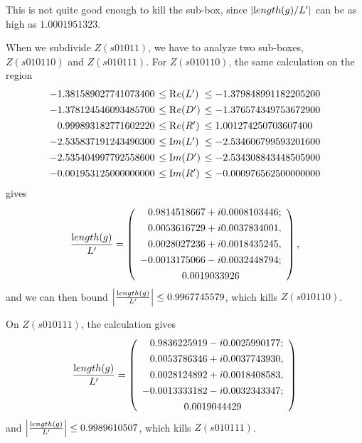 \begin{example}
This is not quite good enough to kill the sub-box, since
$|{\textrm length}(g)/L'|$ can be as high as $1.0001951323$.

When we subdivide $Z(s01011)$, we have to analyze two sub-boxes,
$Z(s010110)$ and $Z(s010111)$.
For $Z(s010110)$, the same calculation on the region
$$\begin{array}{rll}
-1.381589027741073400 &\hskip-6pt \leq {\mathrm Re}(L') &\hskip-6pt\leq -1.379848991182205200\\[4pt]
-1.378124546093485700 &\hskip-6pt\leq {\mathrm Re}(D')
&\hskip-6pt\leq -1.376574349753672900\\[4pt]
0.999893182771602220 &\hskip-6pt\leq {\mathrm Re}(R')&\hskip-6pt \leq 1.001274250703607400\\[4pt]
-2.535837191243490300&\hskip-6pt \leq {\mathrm Im}(L')&\hskip-6pt \leq
-2.534606799593201600\\[4pt]
-2.535404997792558600 &\hskip-6pt\leq {\mathrm Im}(D') &\hskip-6pt\leq -2.534308843448505900\\[4pt]
-0.001953125000000000&\hskip-6pt \leq {\mathrm Im}(R')
&\hskip-6pt\leq -0.000976562500000000
\end{array} 
$$
gives 
$$
{{\textrm length}(g) \over L'} = 
  \left(\begin{array}{c}
 \phantom{-}   0.9814518667 + i 0.0008103446;\\[4pt]
\phantom{-}      0.0053616729 + i 0.0037834001,\\[4pt]
  \phantom{-}    0.0028027236 + i 0.0018435245,\\[4pt]
    -0.0013175066 - i 0.0032448794;\\[4pt]
    0.0019033926
  \end{array}\right),
$$
and we can then bound $\left|{{\textrm length}(g) \over L'}\right| \leq 0.9967745579$,
which kills $Z(s010110)$.  

On $Z(s010111)$, the calculation gives
$$
{{\textrm length}(g) \over L'} =
  \left(\begin{array}{c}
\phantom{-}      0.9836225919 - i 0.0025990177;\\[4pt]
  \phantom{-}    0.0053786346 + i 0.0037743930,\\[4pt]
 \phantom{-}     0.0028124892 + i 0.0018408583,\\[4pt]
    -0.0013333182 - i 0.0032343347;\\[4pt]
    0.0019044429
  \end{array}\right)
$$
and $\left|{{\textrm length}(g) \over L'}\right| \leq 0.9989610507$,
which kills $Z(s010111)$.\end{example}

 
